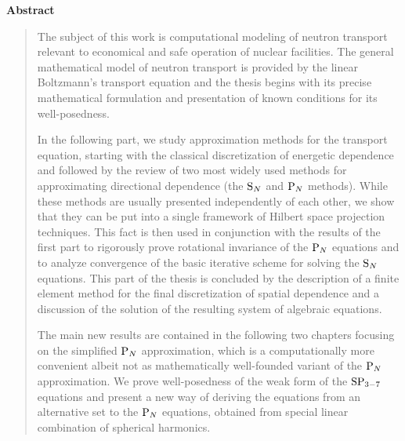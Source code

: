 

\begin{alwayssingle} \pagestyle{empty}
  \begin{center}
  \vspace*{1.5cm}
  {\Large \bfseries  Abstract}
  \end{center}
  \vspace{0.5cm}
\begin{quote}

The subject of this work is computational modeling of neutron transport relevant to economical and safe operation of
nuclear facilities. The general mathematical model of neutron transport is provided by the linear Boltzmann's transport
equation and the thesis begins with its precise mathematical
formulation and presentation of known conditions for its well-posedness.

In the following part, we study approximation methods for the transport equation, starting with the classical
discretization of energetic dependence and followed by the review of two most widely used methods for approximating 
directional dependence (the $\SN$ and $\PN$ methods). While these methods are usually presented independently of each 
other, we show that they can be put into a single framework of Hilbert space projection techniques. This fact is then
used in conjunction with the results of the first part to rigorously prove rotational invariance of the $\PN$
equations and to analyze convergence of the basic iterative scheme for solving the $\SN$ equations. This part of the
thesis is concluded by the description of a finite element method for the final discretization of spatial dependence and a discussion of the solution of the resulting system of
algebraic equations.

The main new results are contained in the following two chapters focusing on the simplified $\PN$ approximation, which
is a computationally more convenient albeit not as mathematically well-founded variant of the $\PN$ approximation. We
prove well-posedness of the weak form of the $\SPN[3-7]$ equations and present a new way of deriving the equations from
an alternative set to the $\PN$ equations, obtained from special linear combination of
spherical harmonics.%


\end{quote}
\end{alwayssingle}
